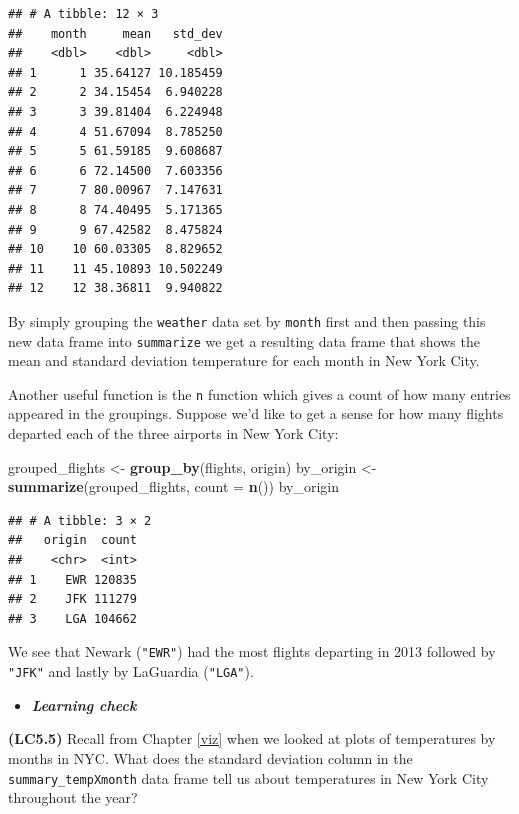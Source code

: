 \documentclass[]{tufte-book}
\newenvironment{Shaded}{\begin{snugshade}}{\end{snugshade}}
\newcommand{\KeywordTok}[1]{\textcolor[rgb]{0.13,0.29,0.53}{\textbf{{#1}}}}
\newcommand{\DataTypeTok}[1]{\textcolor[rgb]{0.13,0.29,0.53}{{#1}}}
\newcommand{\StringTok}[1]{\textcolor[rgb]{0.31,0.60,0.02}{{#1}}}
\newcommand{\NormalTok}[1]{{#1}}
\newenvironment{rmdblock}[1]
  {\begin{shaded*}
  \begin{itemize}
  \renewcommand{\labelitemi}{
    \raisebox{-.7\height}[0pt][0pt]{
    }
  }
  \item
  }
  {
  \end{itemize}
  \end{shaded*}
  }
\newenvironment{learncheck}
  {\begin{rmdblock}{warning}}
  {\end{rmdblock}}
\begin{document}
\begin{verbatim}
## # A tibble: 12 × 3
##    month     mean   std_dev
##    <dbl>    <dbl>     <dbl>
## 1      1 35.64127 10.185459
## 2      2 34.15454  6.940228
## 3      3 39.81404  6.224948
## 4      4 51.67094  8.785250
## 5      5 61.59185  9.608687
## 6      6 72.14500  7.603356
## 7      7 80.00967  7.147631
## 8      8 74.40495  5.171365
## 9      9 67.42582  8.475824
## 10    10 60.03305  8.829652
## 11    11 45.10893 10.502249
## 12    12 38.36811  9.940822
\end{verbatim}

By simply grouping the \texttt{weather} data set by \texttt{month} first
and then passing this new data frame into \texttt{summarize} we get a
resulting data frame that shows the mean and standard deviation
temperature for each month in New York City.

Another useful function is the \texttt{n} function which gives a count
of how many entries appeared in the groupings. Suppose we'd like to get
a sense for how many flights departed each of the three airports in New
York City:

\begin{Shaded}
\begin{Highlighting}[]
\NormalTok{grouped_flights <-}\StringTok{ }\KeywordTok{group_by}\NormalTok{(flights, origin)}
\NormalTok{by_origin <-}\StringTok{ }\KeywordTok{summarize}\NormalTok{(grouped_flights,}
                       \DataTypeTok{count =} \KeywordTok{n}\NormalTok{())}
\NormalTok{by_origin}
\end{Highlighting}
\end{Shaded}

\begin{verbatim}
## # A tibble: 3 × 2
##   origin  count
##    <chr>  <int>
## 1    EWR 120835
## 2    JFK 111279
## 3    LGA 104662
\end{verbatim}

We see that Newark (\texttt{"EWR"}) had the most flights departing in
2013 followed by \texttt{"JFK"} and lastly by LaGuardia
(\texttt{"LGA"}).

\begin{learncheck}
\textbf{\emph{Learning check}}
\end{learncheck}

\textbf{(LC5.5)} Recall from Chapter \ref{viz} when we looked at plots
of temperatures by months in NYC. What does the standard deviation
column in the \texttt{summary\_tempXmonth} data frame tell us about
temperatures in New York City throughout the year?
\end{document}
